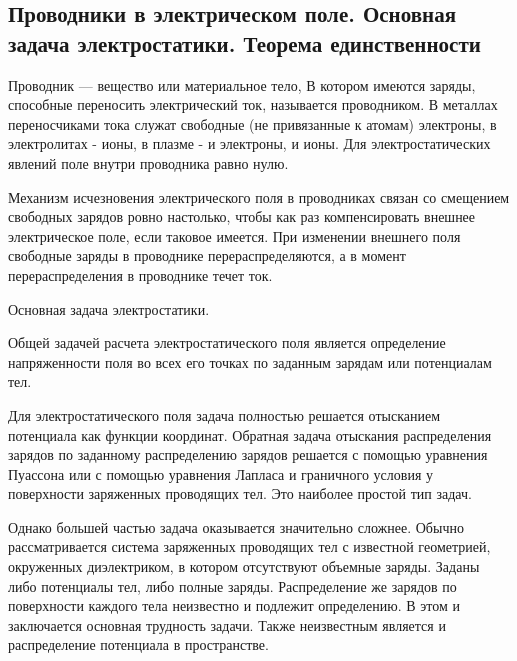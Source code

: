 \subsection{Проводники в электрическом поле. Основная задача электростатики. Теорема единственности}

\begin{definition}
    Проводник — вещество или материальное тело, В котором имеются заряды, способные переносить электрический ток, 
    называется проводником. В металлах переносчиками тока служат свободные (не привязанные к атомам) электроны, 
    в электролитах - ионы, в плазме - и электроны, и ионы. Для электростатических явлений поле внутри проводника равно нулю.
\end{definition}

Механизм исчезновения электрического поля в проводниках связан со смещением свободных зарядов ровно настолько, 
чтобы как раз компенсировать внешнее электрическое поле, если таковое имеется. При изменении внешнего поля свободные заряды 
в проводнике перераспределяются, а в момент перераспределения в проводнике течет ток.

\begin{remark}
    Основная задача электростатики.

    Общей задачей расчета электростатического поля является определение напряженности поля во всех его точках по заданным зарядам или 
    потенциалам тел. 

    Для электростатического поля задача полностью решается отысканием потенциала как функции координат. Обратная задача отыскания 
    распределения зарядов по заданному распределению зарядов решается с помощью уравнения Пуассона или с помощью уравнения Лапласа
    и граничного условия у поверхности заряженных проводящих тел. Это наиболее простой тип задач. 

    Однако большей частью задача оказывается значительно сложнее. Обычно рассматривается система заряженных проводящих тел с 
    известной геометрией, окруженных диэлектриком, в котором отсутствуют объемные заряды. Заданы либо потенциалы тел, либо полные заряды. 
    Распределение же зарядов по поверхности каждого тела неизвестно и подлежит определению. В этом и заключается основная трудность задачи. 
    Также неизвестным является и распределение потенциала в пространстве.
\end{remark}

